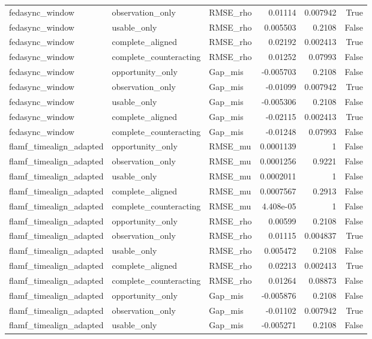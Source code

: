 \begin{tabular}{lllrrr}
fedasync_window & observation_only & RMSE_rho & 0.01114 & 0.007942 & True \\
fedasync_window & usable_only & RMSE_rho & 0.005503 & 0.2108 & False \\
fedasync_window & complete_aligned & RMSE_rho & 0.02192 & 0.002413 & True \\
fedasync_window & complete_counteracting & RMSE_rho & 0.01252 & 0.07993 & False \\
fedasync_window & opportunity_only & Gap_mis & -0.005703 & 0.2108 & False \\
fedasync_window & observation_only & Gap_mis & -0.01099 & 0.007942 & True \\
fedasync_window & usable_only & Gap_mis & -0.005306 & 0.2108 & False \\
fedasync_window & complete_aligned & Gap_mis & -0.02115 & 0.002413 & True \\
fedasync_window & complete_counteracting & Gap_mis & -0.01248 & 0.07993 & False \\
flamf_timealign_adapted & opportunity_only & RMSE_mu & 0.0001139 & 1 & False \\
flamf_timealign_adapted & observation_only & RMSE_mu & 0.0001256 & 0.9221 & False \\
flamf_timealign_adapted & usable_only & RMSE_mu & 0.0002011 & 1 & False \\
flamf_timealign_adapted & complete_aligned & RMSE_mu & 0.0007567 & 0.2913 & False \\
flamf_timealign_adapted & complete_counteracting & RMSE_mu & 4.408e-05 & 1 & False \\
flamf_timealign_adapted & opportunity_only & RMSE_rho & 0.00599 & 0.2108 & False \\
flamf_timealign_adapted & observation_only & RMSE_rho & 0.01115 & 0.004837 & True \\
flamf_timealign_adapted & usable_only & RMSE_rho & 0.005472 & 0.2108 & False \\
flamf_timealign_adapted & complete_aligned & RMSE_rho & 0.02213 & 0.002413 & True \\
flamf_timealign_adapted & complete_counteracting & RMSE_rho & 0.01264 & 0.08873 & False \\
flamf_timealign_adapted & opportunity_only & Gap_mis & -0.005876 & 0.2108 & False \\
flamf_timealign_adapted & observation_only & Gap_mis & -0.01102 & 0.007942 & True \\
flamf_timealign_adapted & usable_only & Gap_mis & -0.005271 & 0.2108 & False \\

\end{tabular}
